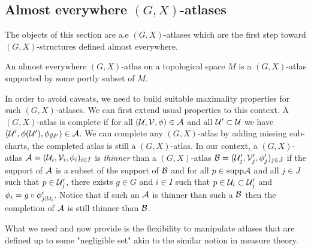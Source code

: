 \subsection{Almost everywhere $(G,X)$-atlases}



The objects of this section are a.e $(G,X)$-atlases which are the first step toward $(G,X)$-structures defined almost everywhere. 
\begin{defi}\label{def:almost_everywhere_atlas_topological} An almost everywhere $(G,X)$-atlas on a topological space $M$ is a $(G,X)$-atlas supported by some portly subset of $M$. 
\end{defi}
In order to avoid caveats, we need to build suitable maximality properties for such $(G,X)$-atlases.  We can first extend usual properties to this context.
A  $(G,X)$-atlas is complete if for all $(\mathcal{U},\mathcal V,\phi)\in\mathcal A$ and all $\mathcal{U}'\subset \mathcal{U}$ we have $ (\mathcal{U}',\phi(\mathcal{U}'),\phi_{|\mathcal{U}'}) \in \mathcal A$. We can complete any $(G,X)$-atlas by adding missing sub-charts, the completed atlas is still a $(G,X)$-atlas.
In our context, a $(G,X)$-atlas $\mathcal A = (\mathcal{U}_i,\mathcal V_i,\phi_i)_{i\in I}$ is {\it thinner} than a $(G,X)$-atlas $\mathcal B = (\mathcal{U}_j',\mathcal V_j',\phi_j')_{j\in J}$ if the support of $\mathcal A$ is a subset of the support of $\mathcal B$ and  for all $p\in \mathrm{supp} \mathcal A$ and all  $j\in J$ such that $p\in \mathcal{U}_j'$, there exists $g\in G$ and $i\in I$ such that $p\in \mathcal{U}_i\subset \mathcal{U}_j'$ and $\phi_{i} = g\circ \phi_{j|\mathcal{U}_i}'$. Notice that if such an $\mathcal A$ is thinner than such a $\mathcal B$ then the completion of $\mathcal A$ is still thinner than $\mathcal B$.

What we need and now provide is the flexibility to manipulate atlases that are defined up to some "negligible set" akin to the similar notion in measure theory. 



